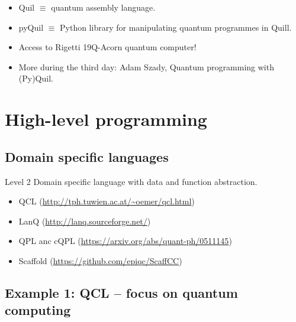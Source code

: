 \documentclass[a4paper,11pt]{article}
\begin{document}
\begin{itemize}
\item Quil $\equiv$ quantum assembly language.
\item pyQuil $\equiv$ Python library for manipulating quantum 
programmes in Quill.
\item Access to Rigetti 19Q-Acorn quantum computer!
\item More during the third day: Adam Szady, Quantum programming 
with (Py)Quil.
\end{itemize}



\section{High-level programming}


\subsection{Domain specific languages}



{Level 2}
Domain specific language with data and function abstraction.


\begin{itemize}
\item QCL (\url{http://tph.tuwien.ac.at/~oemer/qcl.html})
\item LanQ (\url{http://lanq.sourceforge.net/})
\item QPL anc cQPL (\url{https://arxiv.org/abs/quant-ph/0511145})
\item Scaffold (\url{https://github.com/epiqc/ScaffCC})
\end{itemize}



\subsection{Example 1: QCL -- focus on quantum computing}

\end{document}
